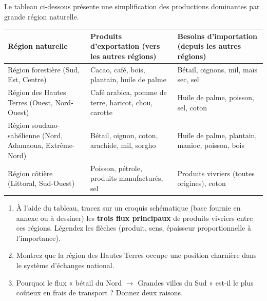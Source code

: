 \documentclass[11pt]{article}
\begin{document}
\begin{exercice}
Le tableau ci-dessous présente une simplification des productions dominantes par grande région naturelle.

\begin{center}
\begin{tabular}{|l|l|l|}
\hline
\textbf{Région naturelle} & \textbf{Produits d'exportation (vers les autres régions)} & \textbf{Besoins d'importation (depuis les autres régions)} \\
\hline
Région forestière (Sud, Est, Centre) & Cacao, café, bois, plantain, huile de palme & Bétail, oignons, mil, maïs sec, sel \\
\hline
Région des Hautes Terres (Ouest, Nord-Ouest) & Café arabica, pomme de terre, haricot, chou, carotte & Huile de palme, poisson, sel, coton \\
\hline
Région soudano-sahélienne (Nord, Adamaoua, Extrême-Nord) & Bétail, oignon, coton, arachide, mil, sorgho & Huile de palme, plantain, manioc, poisson, bois \\
\hline
Région côtière (Littoral, Sud-Ouest) & Poisson, pétrole, produits manufacturés, sel & Produits vivriers (toutes origines), coton \\
\hline
\end{tabular}
\end{center}

\begin{enumerate}
    \item À l'aide du tableau, tracez sur un croquis schématique (base fournie en annexe ou à dessiner) les \textbf{trois flux principaux} de produits vivriers entre ces régions. Légendez les flèches (produit, sens, épaisseur proportionnelle à l'importance).
    \item Montrez que la région des Hautes Terres occupe une position charnière dans le système d'échanges national.
    \item Pourquoi le flux « bétail du Nord $\rightarrow$ Grandes villes du Sud » est-il le plus coûteux en frais de transport ? Donnez deux raisons.
\end{enumerate}
\end{exercice}
\end{document}
